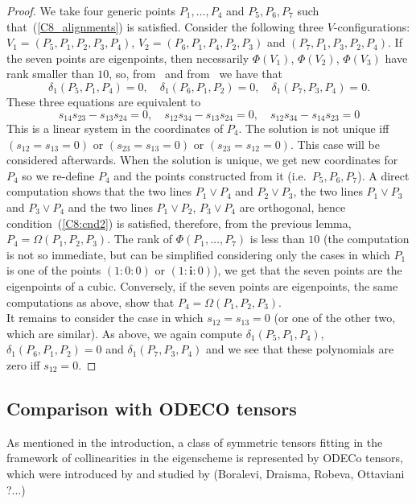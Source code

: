 \documentclass{amsart}
\theoremstyle{plain}
\theoremstyle{definition}
\newcommand{\iii}{\textbf{i}}
\begin{document}
\begin{proof}
We take four generic points
$P_1, \dots, P_4$ and $P_5, P_6, P_7$ such that~(\ref{C8_alignments})
is satisfied. Consider the following three $V$-configurations:
$V_1 = (P_5, P_1, P_2, P_3, P_4)$, $V_2 = (P_6, P_1, P_4, P_2, P_3)$
and $(P_7, P_1, P_3, P_2, P_4)$. If the seven points are eigenpoints,
then necessarily $\Phi(V_1)$, $\Phi(V_2)$, $\Phi(V_3)$ have rank
smaller than $10$, so, from~ and
from~
we have that
\[
\delta_1(P_5, P_1, P_4) = 0, \quad \delta_1(P_6, P_1, P_2) = 0, \quad
\delta_1(P_7, P_3, P_4) = 0.
\]
These three equations are equivalent to
\[
s_{14}s_{23}-s_{13}s_{24} = 0, \quad s_{12}s_{34}-s_{13}s_{24} = 0,
\quad s_{12}s_{34}-s_{14}s_{23} = 0
\]
This is a linear system in the coordinates of $P_4$. The solution is
not unique iff $(s_{12} = s_{13} = 0)$ or $(s_{23} = s_{13} = 0)$
or $(s_{23} = s_{12} = 0)$. This case will be considered afterwards.
When the solution is unique, we get new coordinates for $P_4$ so we
re-define $P_4$ and the points constructed from it (i.e.\ $P_5, P_6, P_7$).
A direct computation shows that the two lines $P_1\vee P_4$ and $P_2\vee P_3$,
the two lines $P_1\vee P_3$ and $P_3\vee P_4$ and the two lines $P_1\vee P_2$, $P_3\vee P_4$
are orthogonal, hence condition~(\ref{C8:cnd2}) is satisfied,
therefore, from the
previous lemma, $P_4 = \Omega(P_1, P_2, P_3)$. The rank
of $\Phi(P_1, \dotsc, P_7)$ is less than $10$ (the computation is
not so immediate, but can be simplified considering only the
cases in which $P_1$ is one of the points $(1: 0: 0)$ or
$(1: \iii: 0)$), we get that the seven points
are the eigenpoints of a cubic. Conversely, if the seven points are
eigenpoints, the same computations as above, show that
$P_4 = \Omega(P_1, P_2, P_3)$.\\
It remains to consider the case in which $s_{12} = s_{13} = 0$ (or one of
the other two, which are similar). As above, we again compute
$\delta_1(P_5, P_1, P_4)$, $\delta_1(P_6, P_1, P_2) = 0$ and
$\delta_1(P_7, P_3, P_4)$ and we see that these  polynomials are zero
iff $s_{12} = 0$.
\end{proof}

\subsection{Comparison with ODECO tensors}
As mentioned in the introduction, a class of
symmetric tensors fitting in the framework of collinearities in the eigenscheme is represented by ODECo tensors, which were introduced by \cite{Rob} and studied by (Boralevi, Draisma, Robeva, Ottaviani ?...)
\end{document}

